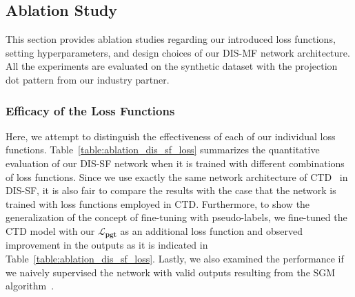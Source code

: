 \subsection{Ablation Study} \label{sec:c2_ablation}
This section provides ablation studies regarding our introduced loss functions, setting hyperparameters, and design choices of our DIS-MF network architecture. All the experiments are evaluated on the synthetic dataset with the projection dot pattern from our industry partner.

\subsubsection{Efficacy of the Loss Functions}
Here, we attempt to distinguish the effectiveness of each of our individual loss functions. Table~\ref{table:ablation_dis_sf_loss} summarizes the quantitative evaluation of our DIS-SF network when it is trained with different combinations of loss functions. Since we use exactly the same network architecture of CTD~\citep{riegler2019connecting} in DIS-SF, it is also fair to compare the results with the case that the network is trained with loss functions employed in CTD. Furthermore, to show the generalization of the concept of fine-tuning with pseudo-labels, we fine-tuned the CTD model with our $\boldsymbol{\mathcal{L}_{pgt}}$ as an additional loss function and observed improvement in the outputs as it is indicated in Table~\ref{table:ablation_dis_sf_loss}. Lastly, we also examined the performance if we naively supervised the network with valid outputs resulting from the SGM algorithm~\citep{hirschmuller2007stereo}.


